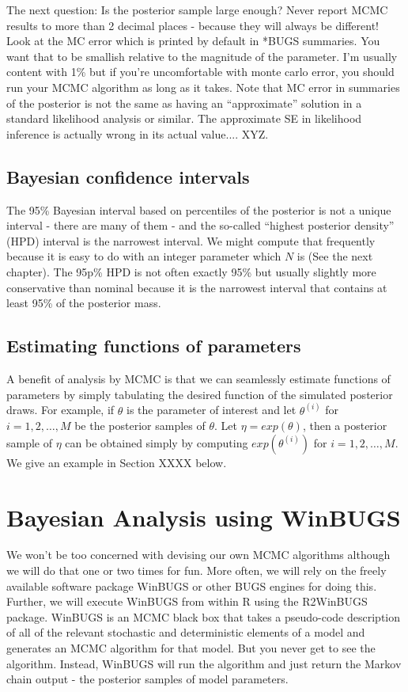 The next question: Is the posterior sample large enough?  Never report MCMC results to more than 2 decimal places - because they will always be different! Look at the MC error which is printed by default in *BUGS summaries.  You want that to be smallish relative to the magnitude of the parameter. I'm usually content with 1\% but if you're uncomfortable with monte carlo error, you should run your MCMC algorithm as long as it takes. Note that MC error in summaries of the posterior is not the same as having an ``approximate'' solution in a standard likelihood analysis or similar.  The approximate SE in likelihood inference is actually wrong in its actual value.... XYZ.


\subsection{Bayesian confidence intervals} 
The 95\% Bayesian interval based on percentiles of the posterior
is not a unique interval - there are many of them - and the so-called
``highest posterior density'' (HPD) interval is the narrowest
interval. We might compute that frequently because it is easy to do
with an integer parameter which $N$ is (See the next chapter). The
95p\% HPD is not often exactly 95\% but usually slightly more
conservative than nominal because it is the narrowest interval that
contains at least 95\%  of the posterior mass.

\subsection{Estimating functions of parameters} A benefit of analysis by MCMC is that we can seamlessly estimate functions of parameters by simply tabulating the desired function of the simulated posterior draws. For example, if $\theta$ is the parameter of interest and let $\theta^{(i)}$ for $i=1,2,\ldots,M$ be the posterior samples of $\theta$. Let $\eta = exp(\theta)$, then a posterior sample of $\eta$ can be obtained simply by computing $exp(\theta^{(i)})$ for $i=1,2,\ldots,M$. We give an example in Section XXXX below.


\section{Bayesian Analysis using WinBUGS}

We won't be too concerned with devising our own MCMC algorithms although we will do that one or two times for fun.  More often, we will rely on the freely available software package WinBUGS or other BUGS engines for doing this.  Further, we will execute WinBUGS from within R using the R2WinBUGS package. WinBUGS is an MCMC black box that takes a pseudo-code description of all of the relevant stochastic and deterministic elements of a model and generates an MCMC algorithm for that model. But you never get to see the algorithm. Instead, WinBUGS will run the algorithm and just return the Markov chain output - the posterior samples of model parameters. 

